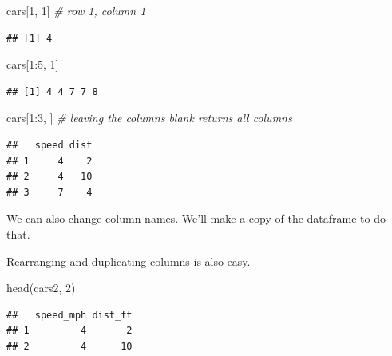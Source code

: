 \documentclass[
  11pt,
  a4paper,
]{book}
\newenvironment{Shaded}{\begin{snugshade}}{\end{snugshade}}
\newcommand{\CommentTok}[1]{\textcolor[rgb]{0.56,0.35,0.01}{\textit{#1}}}
\newcommand{\DecValTok}[1]{\textcolor[rgb]{0.00,0.00,0.81}{#1}}
\newcommand{\FunctionTok}[1]{\textcolor[rgb]{0.00,0.00,0.00}{#1}}
\newcommand{\NormalTok}[1]{#1}
\newcommand{\SpecialCharTok}[1]{\textcolor[rgb]{0.00,0.00,0.00}{#1}}
\begin{document}
\begin{Shaded}
\begin{Highlighting}[]
\NormalTok{cars[}\DecValTok{1}\NormalTok{, }\DecValTok{1}\NormalTok{] }\CommentTok{\# row 1, column 1}
\end{Highlighting}
\end{Shaded}

\begin{verbatim}
## [1] 4
\end{verbatim}

\begin{Shaded}
\begin{Highlighting}[]
\NormalTok{cars[}\DecValTok{1}\SpecialCharTok{:}\DecValTok{5}\NormalTok{, }\DecValTok{1}\NormalTok{]}
\end{Highlighting}
\end{Shaded}

\begin{verbatim}
## [1] 4 4 7 7 8
\end{verbatim}

\begin{Shaded}
\begin{Highlighting}[]
\NormalTok{cars[}\DecValTok{1}\SpecialCharTok{:}\DecValTok{3}\NormalTok{, ] }\CommentTok{\# leaving the columns blank returns all columns}
\end{Highlighting}
\end{Shaded}

\begin{verbatim}
##   speed dist
## 1     4    2
## 2     4   10
## 3     7    4
\end{verbatim}

We can also change column names. We'll make a copy of the dataframe to do that.

Rearranging and duplicating columns is also easy.

\begin{Shaded}
\begin{Highlighting}[]
\FunctionTok{head}\NormalTok{(cars2, }\DecValTok{2}\NormalTok{) }
\end{Highlighting}
\end{Shaded}

\begin{verbatim}
##   speed_mph dist_ft
## 1         4       2
## 2         4      10
\end{verbatim}

\begin{Shaded}
\end{Shaded}
\end{document}
